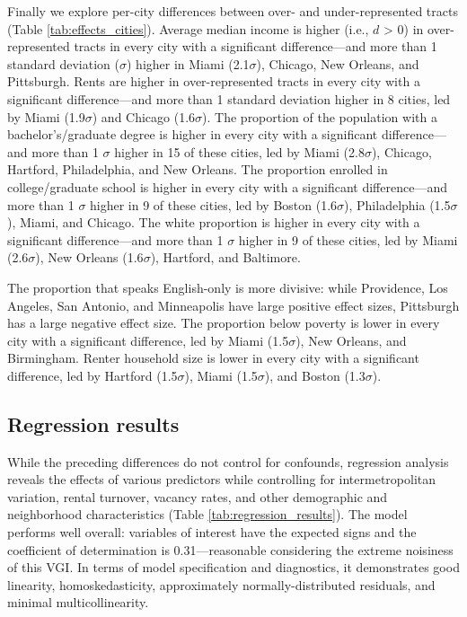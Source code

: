\documentclass[12pt,onecolumn]{article} %
\begin{document}
Finally we explore per-city differences between over- and under-represented tracts (Table \ref{tab:effects_cities}). Average median income is higher (i.e., $d$ > 0) in over-represented tracts in every city with a significant difference---and more than 1 standard deviation ($\sigma$) higher in Miami (2.1$\sigma$), Chicago, New Orleans, and Pittsburgh. Rents are higher in over-represented tracts in every city with a significant difference---and more than 1 standard deviation higher in 8 cities, led by Miami (1.9$\sigma$) and Chicago (1.6$\sigma$). The proportion of the population with a bachelor's/graduate degree is higher in every city with a significant difference---and more than 1 $\sigma$ higher in 15 of these cities, led by Miami (2.8$\sigma$), Chicago, Hartford, Philadelphia, and New Orleans. The proportion enrolled in college/graduate school is higher in every city with a significant difference---and more than 1 $\sigma$ higher in 9 of these cities, led by Boston (1.6$\sigma$), Philadelphia (1.5$\sigma$), Miami, and Chicago. The white proportion is higher in every city with a significant difference---and more than 1 $\sigma$ higher in 9 of these cities, led by Miami (2.6$\sigma$), New Orleans (1.6$\sigma$), Hartford, and Baltimore.

The proportion that speaks English-only is more divisive: while Providence, Los Angeles, San Antonio, and Minneapolis have large positive effect sizes, Pittsburgh has a large negative effect size. The proportion below poverty is lower in every city with a significant difference, led by Miami (1.5$\sigma$), New Orleans, and Birmingham. Renter household size is lower in every city with a significant difference, led by Hartford (1.5$\sigma$), Miami (1.5$\sigma$), and Boston (1.3$\sigma$).

\subsection{Regression results}

While the preceding differences do not control for confounds, regression analysis reveals the effects of various predictors while controlling for intermetropolitan variation, rental turnover, vacancy rates, and other demographic and neighborhood characteristics (Table \ref{tab:regression_results}). The model performs well overall: variables of interest have the expected signs and the coefficient of determination is 0.31---reasonable considering the extreme noisiness of this VGI. In terms of model specification and diagnostics, it demonstrates good linearity, homoskedasticity, approximately normally-distributed residuals, and minimal multicollinearity.
\end{document}
